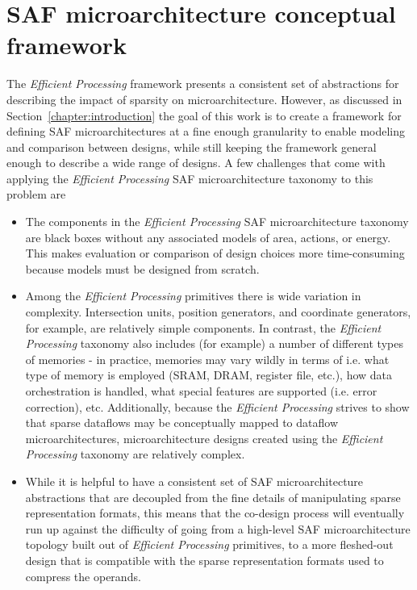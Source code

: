 \chapter{SAF microarchitecture conceptual framework}
\label{chapter:conceptual_framework}

The \textit{Efficient Processing} framework presents a consistent set of abstractions for describing the impact of sparsity on microarchitecture. However, as discussed in Section~\ref{chapter:introduction} the goal of this work is to create a framework for defining SAF microarchitectures at a fine enough granularity to enable modeling and comparison between designs, while still keeping the framework general enough to describe a wide range of designs. A few challenges that come with applying the \textit{Efficient Processing} SAF microarchitecture taxonomy to this problem are

\begin{itemize}
    \item The components in the \textit{Efficient Processing} SAF microarchitecture taxonomy are black boxes without any associated models of area, actions, or energy. This makes evaluation or comparison of design choices more time-consuming because models must be designed from scratch.
    \item Among the \textit{Efficient Processing} primitives there is wide variation in complexity. Intersection units, position generators, and coordinate generators, for example, are relatively simple components. In contrast, the \textit{Efficient Processing} taxonomy also includes (for example) a number of different types of memories - in practice, memories may vary wildly in terms of i.e. what type of memory is employed (SRAM, DRAM, register file, etc.), how data orchestration is handled, what special features are supported (i.e. error correction), etc. Additionally, because the \textit{Efficient Processing} strives to show that sparse dataflows may be conceptually mapped to dataflow microarchitectures, microarchitecture designs created using the \textit{Efficient Processing} taxonomy are relatively complex.
    \item While it is helpful to have a consistent set of SAF microarchitecture abstractions that are decoupled from the fine details of manipulating sparse representation formats, this means that the co-design process will eventually run up against the difficulty of going from a high-level SAF microarchitecture topology built out of \textit{Efficient Processing} primitives, to a more fleshed-out design that is compatible with the sparse representation formats used to compress the operands.
    
\end{itemize}

